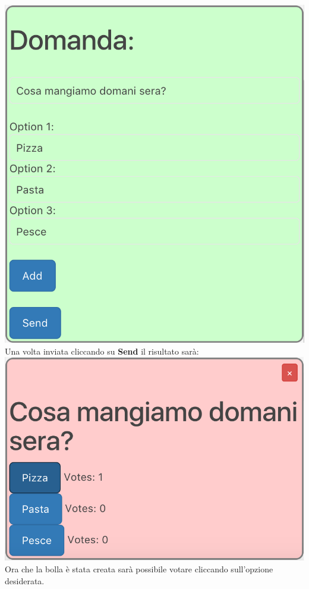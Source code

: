 \includegraphics[scale=0.75]{img/pollConfig.png}
\\
Una volta inviata cliccando su \textbf{Send} il risultato sarà:\\

\includegraphics[scale=0.74]{img/poll.png}
\\ 
Ora che la bolla è stata creata sarà possibile votare cliccando sull'opzione desiderata.
